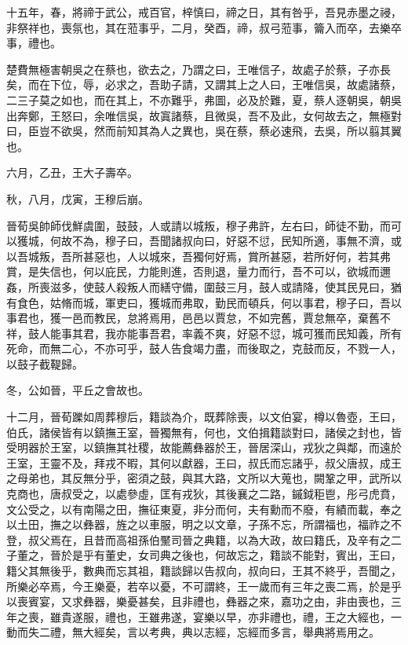 \begin{pinyinscope}
十五年，春，將禘于武公，戒百官，梓慎曰，禘之日，其有咎乎，吾見赤墨之祲，非祭祥也，喪氛也，其在蒞事乎，二月，癸酉，禘，叔弓蒞事，籥入而卒，去樂卒事，禮也。

楚費無極害朝吳之在蔡也，欲去之，乃謂之曰，王唯信子，故處子於蔡，子亦長矣，而在下位，辱，必求之，吾助子請，又謂其上之人曰，王唯信吳，故處諸蔡，二三子莫之如也，而在其上，不亦難乎，弗圖，必及於難，夏，蔡人逐朝吳，朝吳出奔鄭，王怒曰，余唯信吳，故寘諸蔡，且微吳，吾不及此，女何故去之，無極對曰，臣豈不欲吳，然而前知其為人之異也，吳在蔡，蔡必速飛，去吳，所以翦其翼也。

六月，乙丑，王大子壽卒。

秋，八月，戊寅，王穆后崩。

晉荀吳帥師伐鮮虞圍，鼓鼓，人或請以城叛，穆子弗許，左右曰，師徒不勤，而可以獲城，何故不為，穆子曰，吾聞諸叔向曰，好惡不愆，民知所適，事無不濟，或以吾城叛，吾所甚惡也，人以城來，吾獨何好焉，賞所甚惡，若所好何，若其弗賞，是失信也，何以庇民，力能則進，否則退，量力而行，吾不可以，欲城而邇姦，所喪滋多，使鼓人殺叛人而繕守備，圍鼓三月，鼓人或請降，使其民見曰，猶有食色，姑脩而城，軍吏曰，獲城而弗取，勤民而頓兵，何以事君，穆子曰，吾以事君也，獲一邑而教民，怠將焉用，邑邑以賈怠，不如完舊，賈怠無卒，棄舊不祥，鼓人能事其君，我亦能事吾君，率義不爽，好惡不愆，城可獲而民知義，所有死命，而無二心，不亦可乎，鼓人告食竭力盡，而後取之，克鼓而反，不戮一人，以鼓子截鞮歸。

冬，公如晉，平丘之會故也。

十二月，晉荀躒如周葬穆后，籍談為介，既葬除喪，以文伯宴，樽以魯壺，王曰，伯氏，諸侯皆有以鎮撫王室，晉獨無有，何也，文伯揖籍談對曰，諸侯之封也，皆受明器於王室，以鎮撫其社稷，故能薦彝器於王，晉居深山，戎狄之與鄰，而遠於王室，王靈不及，拜戎不暇，其何以獻器，王曰，叔氏而忘諸乎，叔父唐叔，成王之母弟也，其反無分乎，密須之鼓，與其大路，文所以大蒐也，闕鞏之甲，武所以克商也，唐叔受之，以處參虛，匡有戎狄，其後襄之二路，鏚鉞秬鬯，彤弓虎賁，文公受之，以有南陽之田，撫征東夏，非分而何，夫有勳而不廢，有績而載，奉之以土田，撫之以彝器，旌之以車服，明之以文章，子孫不忘，所謂福也，福祚之不登，叔父焉在，且昔而高祖孫伯黶司晉之典籍，以為大政，故曰籍氏，及辛有之二子董之，晉於是乎有董史，女司典之後也，何故忘之，籍談不能對，賓出，王曰，籍父其無後乎，數典而忘其祖，籍談歸以告叔向，叔向曰，王其不終乎，吾聞之，所樂必卒焉，今王樂憂，若卒以憂，不可謂終，王一歲而有三年之喪二焉，於是乎以喪賓宴，又求彝器，樂憂甚矣，且非禮也，彝器之來，嘉功之由，非由喪也，三年之喪，雖貴遂服，禮也，王雖弗遂，宴樂以早，亦非禮也，禮，王之大經也，一動而失二禮，無大經矣，言以考典，典以志經，忘經而多言，舉典將焉用之。


\end{pinyinscope}
